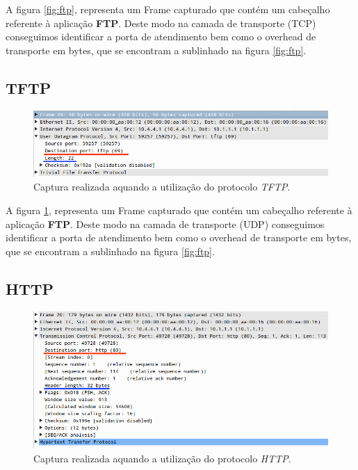 \documentclass{llncs}
\begin{document}
A figura \ref{fig:ftp}, representa um Frame capturado que contém um cabeçalho referente à aplicação \textbf{FTP}. Deste modo na camada de transporte (TCP) conseguimos identificar a porta de atendimento bem como o overhead de transporte em bytes, que se encontram a sublinhado na figura \ref{fig:ftp}.


\subsection{TFTP}

\begin{figure}[H]
\begin{center}
\includegraphics[scale=0.4]{tftp.png}
\end{center}
\caption{\label{fig:tftp}Captura realizada aquando a utilização do protocolo \emph{TFTP}.}
\end{figure}

A figura \ref{fig:tftp}, representa um Frame capturado que contém um cabeçalho referente à aplicação \textbf{FTP}. Deste modo na camada de transporte (UDP) conseguimos identificar a porta de atendimento bem como o overhead de transporte em bytes, que se encontram a sublinhado na figura \ref{fig:ftp}.


\subsection{HTTP}

\begin{figure}[H]
\begin{center}
\includegraphics[scale=0.4]{http.png}
\end{center}
\caption{\label{fig:http}Captura realizada aquando a utilização do protocolo \emph{HTTP}.}
\end{figure}
\end{document}
